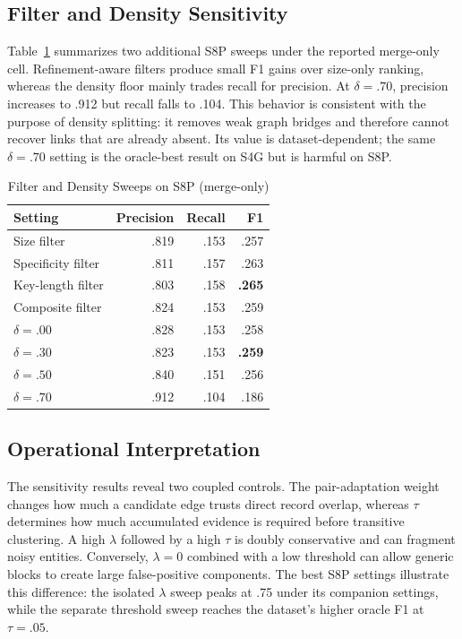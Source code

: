 \documentclass[conference]{IEEEtran}
\begin{document}
\subsection{Filter and Density Sensitivity}
Table~\ref{tab:filterdensity} summarizes two additional S8P sweeps under the reported merge-only cell. Refinement-aware filters produce small F1 gains over size-only ranking, whereas the density floor mainly trades recall for precision. At $\delta=.70$, precision increases to .912 but recall falls to .104. This behavior is consistent with the purpose of density splitting: it removes weak graph bridges and therefore cannot recover links that are already absent. Its value is dataset-dependent; the same $\delta=.70$ setting is the oracle-best result on S4G but is harmful on S8P.

\begin{table}[t]
\caption{Filter and Density Sweeps on S8P (merge-only)}
\label{tab:filterdensity}
\centering
\scriptsize
\setlength{\tabcolsep}{3.2pt}
\begin{tabular}{lrrr}
\toprule
Setting & Precision & Recall & F1 \\
\midrule
Size filter & .819 & .153 & .257 \\
Specificity filter & .811 & .157 & .263 \\
Key-length filter & .803 & .158 & \textbf{.265} \\
Composite filter & .824 & .153 & .259 \\
\midrule
$\delta=.00$ & .828 & .153 & .258 \\
$\delta=.30$ & .823 & .153 & \textbf{.259} \\
$\delta=.50$ & .840 & .151 & .256 \\
$\delta=.70$ & .912 & .104 & .186 \\
\bottomrule
\end{tabular}
\end{table}

\subsection{Operational Interpretation}
The sensitivity results reveal two coupled controls. The pair-adaptation weight changes how much a candidate edge trusts direct record overlap, whereas $\tau$ determines how much accumulated evidence is required before transitive clustering. A high $\lambda$ followed by a high $\tau$ is doubly conservative and can fragment noisy entities. Conversely, $\lambda=0$ combined with a low threshold can allow generic blocks to create large false-positive components. The best S8P settings illustrate this difference: the isolated $\lambda$ sweep peaks at .75 under its companion settings, while the separate threshold sweep reaches the dataset's higher oracle F1 at $\tau=.05$.
\end{document}

